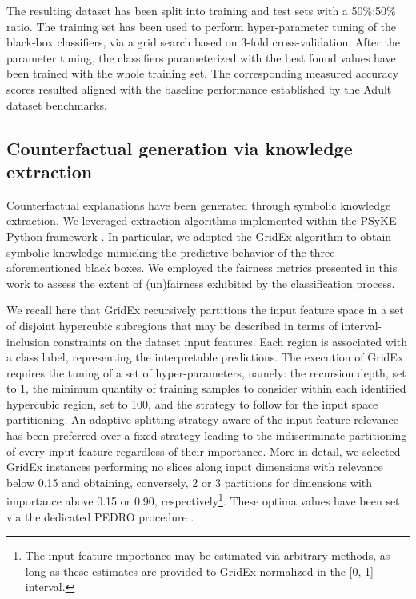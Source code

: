\documentclass[letterpaper]{article} %
\begin{document}
The resulting dataset has been split into training and test sets with a 50\%:50\% ratio.
%
The training set has been used to perform hyper-parameter tuning of the black-box classifiers, via a grid search based on 3-fold cross-validation.
%
After the parameter tuning, the classifiers parameterized with the best found values have been trained with the whole training set.
%
The corresponding measured accuracy scores resulted aligned with the baseline performance established by the Adult dataset benchmarks.


\subsection{Counterfactual generation via knowledge extraction}

Counterfactual explanations have been generated through symbolic knowledge extraction.
%
We leveraged extraction algorithms implemented within the PSyKE Python framework \cite{psyke-ia2022,psyke-trust-aixia2022}. In particular, we adopted the GridEx algorithm \cite{gridex-extraamas2021} to obtain symbolic knowledge mimicking the predictive behavior of the three aforementioned black boxes.
%
We employed the fairness metrics presented in this work to assess the extent of (un)fairness exhibited by the classification process.

We recall here that GridEx recursively partitions the input feature space in a set of disjoint hypercubic subregions that may be described in terms of interval-inclusion constraints on the dataset input features.
Each region is associated with a class label, representing the interpretable predictions.
The execution of GridEx requires the tuning of a set of hyper-parameters, namely: the recursion depth, set to 1, the minimum quantity of training samples to consider within each identified hypercubic region, set to 100, and the strategy to follow for the input space partitioning.
%
An adaptive splitting strategy aware of the input feature relevance has been preferred over a fixed strategy leading to the indiscriminate partitioning of every input feature regardless of their importance. More in detail, we selected GridEx instances performing no slices along input dimensions with relevance below 0.15 and obtaining, conversely, 2 or 3 partitions for dimensions with importance above 0.15 or 0.90, respectively\footnote{The input feature importance may be estimated via arbitrary methods, as long as these estimates are provided to GridEx normalized in the [0, 1] interval.}.
%
These optima values have been set via the dedicated PEDRO procedure \cite{gridrex-kr2022}.
\end{document}
